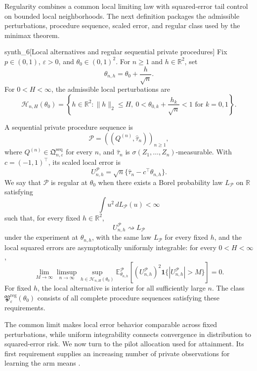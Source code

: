Regularity combines a common local limiting law with squared-error tail control on bounded local neighborhoods. The next definition packages the admissible perturbations, procedure sequence, scaled error, and regular class used by the minimax theorem.

\begin{definitionv}{synth_6}[Local alternatives and regular sequential private procedures]
Fix \(p\in(0,1)\), \(\varepsilon>0\), and \(\theta_0\in(0,1)^2\). For \(n\ge1\) and \(h\in\mathbb R^2\), set
\[
\theta_{n,h}=\theta_0+\frac{h}{\sqrt n}.
\]
For \(0<H<\infty\), the admissible local perturbations are
\[
\mathcal H_{n,H}(\theta_0)
=\left\{h\in\mathbb R^2:
\|h\|_2\le H,\ 
0<\theta_{0,k}+\frac{h_k}{\sqrt n}<1
\text{ for }k=0,1\right\}.
\]

A sequential private procedure sequence is
\[
\mathcal P=((Q^{(n)},\widehat\tau_n))_{n\ge1},
\]
where \(Q^{(n)}\in\mathfrak Q^{\mathrm{seq}}_{n,\varepsilon}\) for every \(n\), and \(\widehat\tau_n\) is \(\sigma(Z_1,\ldots,Z_n)\)-measurable. With \(c=(-1,1)^\top\), its scaled local error is
\[
U_{n,h}^{\mathcal P}
=\sqrt n\{\widehat\tau_n-c^\top\theta_{n,h}\}.
\]
We say that \(\mathcal P\) is regular at \(\theta_0\) when there exists a Borel probability law \(L_{\mathcal P}\) on \(\mathbb R\) satisfying
\[
\int u^2\,dL_{\mathcal P}(u)<\infty
\]
such that, for every fixed \(h\in\mathbb R^2\),
\[
U_{n,h}^{\mathcal P}\rightsquigarrow L_{\mathcal P}
\]
under the experiment at \(\theta_{n,h}\), with the same law \(L_{\mathcal P}\) for every fixed \(h\), and the local squared errors are asymptotically uniformly integrable: for every \(0<H<\infty\),
\[
\lim_{M\to\infty}\limsup_{n\to\infty}
\sup_{h\in\mathcal H_{n,H}(\theta_0)}
\mathbb E_{\theta_{n,h}}^{\mathcal P}
\left[
(U_{n,h}^{\mathcal P})^2
\mathbf1\{|U_{n,h}^{\mathcal P}|>M\}
\right]=0.
\]
For fixed \(h\), the local alternative is interior for all sufficiently large \(n\). The class \(\mathfrak P^{\mathrm{reg}}_{\varepsilon}(\theta_0)\) consists of all complete procedure sequences satisfying these requirements.
\end{definitionv}

The common limit makes local error behavior comparable across fixed perturbations, while uniform integrability connects convergence in distribution to squared-error risk. We now turn to the pilot allocation used for attainment. Its first requirement supplies an increasing number of private observations for learning the arm means \citep{KalininSteinberger2025}.

